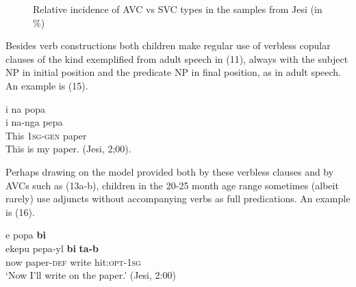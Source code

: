 \documentclass[output=paper]{langsci/langscibook}
\begin{document}
\begin{figure}
 \caption{Relative incidence of AVC vs SVC types in the samples from Jesi (in \%)}
 \label{fig:rumsey:4}
\end{figure}

\clearpage 

Besides verb constructions both children make regular use of verbless copular clauses of the kind exemplified from adult speech in (11), always with the subject NP in initial position and the predicate NP in final position, as in adult speech.  An example is (15).

\ea
    \glll i         na           popa        \\
    i        na-nga      pepa\\
        This    1\textsc{sg}-\textsc{gen}    paper\\
        \glt This is my paper. (Jesi, 2;00).
\z

Perhaps drawing on the model provided both by these verbless clauses and by AVCs such as (13a-b), children in the 20-25 month age range sometimes (albeit rarely) use adjuncts without accompanying verbs as full predications. An example is (16).

\ea
\glll      e      popa         \textbf{bi}\\
          ekepu   pepa-yl      \textbf{bi}      \textbf{ta-b}\\
          now    paper-\textsc{def}    write    hit:\textsc{opt}-1\textsc{sg}\\
          \glt `Now I'll write on the paper.' (Jesi, 2:00)
\z
\end{document}
